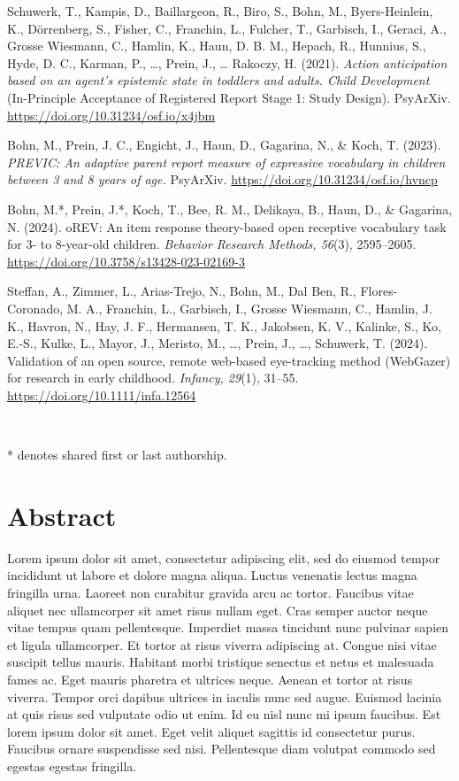 \documentclass[
]{scrbook}
\begin{document}
Schuwerk, T., Kampis, D., Baillargeon, R., Biro, S., Bohn, M., Byers-Heinlein, K., Dörrenberg, S., Fisher, C., Franchin, L., Fulcher, T., Garbisch, I., Geraci, A., Grosse Wiesmann, C., Hamlin, K., Haun, D. B. M., Hepach, R., Hunnius, S., Hyde, D. C., Karman, P., \ldots, Prein, J., \ldots{} Rakoczy, H. (2021). \emph{Action anticipation based on an agent's epistemic state in toddlers and adults. Child Development} (In-Principle Acceptance of Registered Report Stage 1: Study Design). PsyArXiv. \url{https://doi.org/10.31234/osf.io/x4jbm}

Bohn, M., Prein, J. C., Engicht, J., Haun, D., Gagarina, N., \& Koch, T. (2023). \emph{PREVIC: An adaptive parent report measure of expressive vocabulary in children between 3 and 8 years of age.} PsyArXiv. \url{https://doi.org/10.31234/osf.io/hvncp}

Bohn, M.*, Prein, J.*, Koch, T., Bee, R. M., Delikaya, B., Haun, D., \& Gagarina, N. (2024). oREV: An item response theory-based open receptive vocabulary task for 3- to 8-year-old children. \emph{Behavior Research Methods, 56}(3), 2595--2605. \url{https://doi.org/10.3758/s13428-023-02169-3}

Steffan, A., Zimmer, L., Arias-Trejo, N., Bohn, M., Dal Ben, R., Flores-Coronado, M. A., Franchin, L., Garbisch, I., Grosse Wiesmann, C., Hamlin, J. K., Havron, N., Hay, J. F., Hermansen, T. K., Jakobsen, K. V., Kalinke, S., Ko, E.-S., Kulke, L., Mayor, J., Meristo, M., \ldots, Prein, J., \ldots, Schuwerk, T. (2024). Validation of an open source, remote web-based eye-tracking method (WebGazer) for research in early childhood. \emph{Infancy, 29}(1), 31--55. \url{https://doi.org/10.1111/infa.12564}

~

* denotes shared first or last authorship.

\chapter*{Abstract}\label{abstract}

Lorem ipsum dolor sit amet, consectetur adipiscing elit, sed do eiusmod tempor incididunt ut labore et dolore magna aliqua. Luctus venenatis lectus magna fringilla urna. Laoreet non curabitur gravida arcu ac tortor. Faucibus vitae aliquet nec ullamcorper sit amet risus nullam eget. Cras semper auctor neque vitae tempus quam pellentesque. Imperdiet massa tincidunt nunc pulvinar sapien et ligula ullamcorper. Et tortor at risus viverra adipiscing at. Congue nisi vitae suscipit tellus mauris. Habitant morbi tristique senectus et netus et malesuada fames ac. Eget mauris pharetra et ultrices neque. Aenean et tortor at risus viverra. Tempor orci dapibus ultrices in iaculis nunc sed augue. Euismod lacinia at quis risus sed vulputate odio ut enim. Id eu nisl nunc mi ipsum faucibus. Est lorem ipsum dolor sit amet. Eget velit aliquet sagittis id consectetur purus. Faucibus ornare suspendisse sed nisi. Pellentesque diam volutpat commodo sed egestas egestas fringilla.
\end{document}
